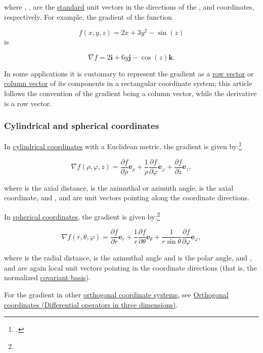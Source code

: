 \documentclass[
]{article}
\begin{document}
where , , are the \href{standard_basis}{standard} unit vectors in the
directions of the , and coordinates, respectively. For example, the
gradient of the function

\[f(x,y,z)= 2x+3y^2-\sin(z)\] is

\[\nabla f = 2\mathbf{i}+ 6y\mathbf{j} -\cos(z)\mathbf{k}.\]

In some applications it is customary to represent the gradient as a
\href{row_vector}{row vector} or \href{column_vector}{column vector} of
its components in a rectangular coordinate system; this article follows
the convention of the gradient being a column vector, while the
derivative is a row vector.

\hypertarget{cylindrical_and_spherical_coordinates}{%
\subsubsection{Cylindrical and spherical
coordinates}\label{cylindrical_and_spherical_coordinates}}

In \href{cylindrical_coordinate_system\#Definition}{cylindrical
coordinates} with a Euclidean metric, the gradient is given
by:\footnote{.}

\[\nabla f(\rho, \varphi, z) = \frac{\partial f}{\partial \rho}\mathbf{e}_\rho + \frac{1}{\rho}\frac{\partial f}{\partial \varphi}\mathbf{e}_\varphi + \frac{\partial f}{\partial z}\mathbf{e}_z,\]

where is the axial distance, is the azimuthal or azimuth angle, is the
axial coordinate, and , and are unit vectors pointing along the
coordinate directions.

In \href{spherical_coordinate_system\#Definition}{spherical
coordinates}, the gradient is given by:\footnote{}

\[\nabla f(r, \theta, \varphi) = \frac{\partial f}{\partial r}\mathbf{e}_r + \frac{1}{r}\frac{\partial f}{\partial \theta}\mathbf{e}_\theta + \frac{1}{r \sin\theta}\frac{\partial f}{\partial \varphi}\mathbf{e}_\varphi,\]

where is the radial distance, is the azimuthal angle and is the polar
angle, and , and are again local unit vectors pointing in the coordinate
directions (that is, the normalized
\href{Curvilinear_coordinates\#Covariant_and_contravariant_bases}{covariant
basis}).

For the gradient in other \href{orthogonal_coordinate_system}{orthogonal
coordinate systems}, see
\href{Orthogonal_coordinates\#Differential_operators_in_three_dimensions}{Orthogonal
coordinates (Differential operators in three dimensions)}.
\end{document}
